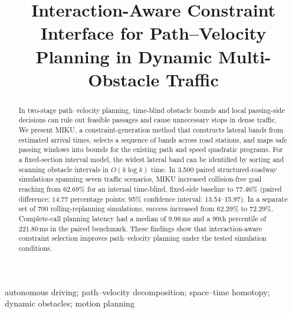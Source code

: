 \documentclass[largeformat]{interact}
\title{Interaction-Aware Constraint Interface for Path--Velocity Planning in Dynamic Multi-Obstacle Traffic}
\author{\name{Anonymous authors}\affil{Affiliations withheld for anonymous review}}
\theoremstyle{plain}
\begin{document}
\maketitle

\begin{abstract}
In two-stage path--velocity planning, time-blind obstacle bounds and local passing-side decisions can rule out feasible passages and cause unnecessary stops in dense traffic. We present MIKU, a constraint-generation method that constructs lateral bands from estimated arrival times, selects a sequence of bands across road stations, and maps safe passing windows into bounds for the existing path and speed quadratic programs. For a fixed-section interval model, the widest lateral band can be identified by sorting and scanning obstacle intervals in $O(k\log k)$ time. In 3{,}500 paired structured-roadway simulations spanning seven traffic scenarios, MIKU increased collision-free goal reaching from 62.69\% for an internal time-blind, fixed-side baseline to 77.46\% (paired difference: 14.77 percentage points; 95\% confidence interval: 13.54--15.97). In a separate set of 700 rolling-replanning simulations, success increased from 62.29\% to 72.29\%. Complete-call planning latency had a median of 9.98\,ms and a 99th percentile of 221.80\,ms in the paired benchmark. These findings show that interaction-aware constraint selection improves path--velocity planning under the tested simulation conditions.
\end{abstract}

\begin{keywords}
autonomous driving; path--velocity decomposition; space--time homotopy; dynamic obstacles; motion planning
\end{keywords}













\end{document}

